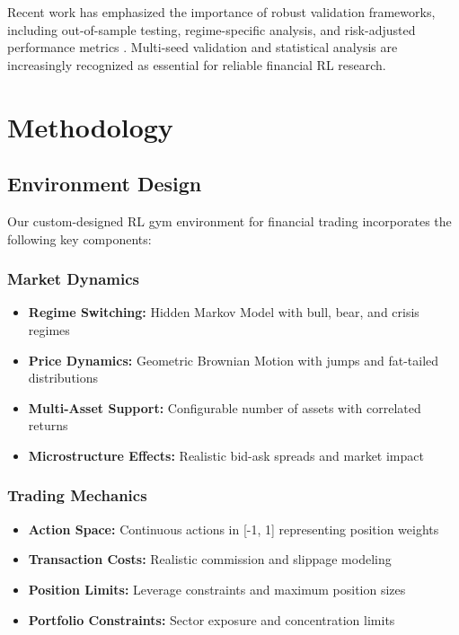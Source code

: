 \documentclass[10pt,journal]{IEEEtran}
\begin{document}
Recent work has emphasized the importance of robust validation frameworks, including out-of-sample testing, regime-specific analysis, and risk-adjusted performance metrics \cite{ref16}. Multi-seed validation and statistical analysis are increasingly recognized as essential for reliable financial RL research.

\section{Methodology}

\subsection{Environment Design}
Our custom-designed RL gym environment for financial trading incorporates the following key components:

\subsubsection{Market Dynamics}
\begin{itemize}
\item \textbf{Regime Switching:} Hidden Markov Model with bull, bear, and crisis regimes
\item \textbf{Price Dynamics:} Geometric Brownian Motion with jumps and fat-tailed distributions
\item \textbf{Multi-Asset Support:} Configurable number of assets with correlated returns
\item \textbf{Microstructure Effects:} Realistic bid-ask spreads and market impact
\end{itemize}

\subsubsection{Trading Mechanics}
\begin{itemize}
\item \textbf{Action Space:} Continuous actions in [-1, 1] representing position weights
\item \textbf{Transaction Costs:} Realistic commission and slippage modeling
\item \textbf{Position Limits:} Leverage constraints and maximum position sizes
\item \textbf{Portfolio Constraints:} Sector exposure and concentration limits
\end{itemize}
\end{document}
